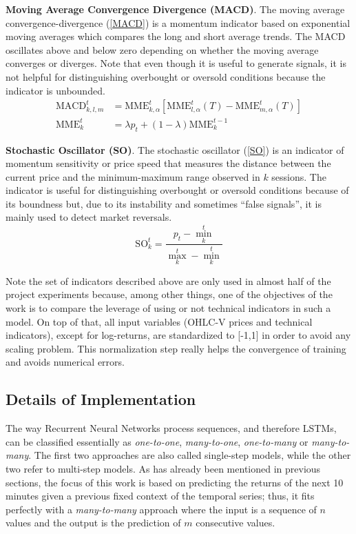 \documentclass[10pt,twocolumn,letterpaper]{article}
\begin{document}
\textbf{Moving Average Convergence Divergence (MACD)}.
The moving average convergence-divergence (\ref{MACD}) is a momentum indicator based on exponential moving averages which compares the long and short average trends. The MACD oscillates above and below zero depending on whether the moving average converges or diverges. Note that even though it is useful to generate signals, it is not helpful for distinguishing overbought or oversold conditions because the indicator is unbounded.
\begin{align} \label{MACD}
	\text{MACD}_{k,l,m}^t &= \text{MME}_{k,\alpha}^t [\text{MME}_{l,\alpha}^t (T) - \text{MME}_{m,\alpha}^t (T)] \nonumber \\
	\text{MME}_k^t &= \lambda p_t + (1 - \lambda)\text{MME}_k^{t-1}
\end{align}

\textbf{Stochastic Oscillator (SO)}.
The stochastic oscillator (\ref{SO}) is an indicator of momentum sensitivity or price speed that measures the distance between the current price and the minimum-maximum range observed in $k$ sessions. The indicator is useful for distinguishing overbought or oversold conditions because of its boundness but, due to its instability and sometimes “false signals”, it is mainly used to detect market reversals.
\begin{equation} \label{SO}
	\text{SO}_k^t = \frac{p_t - \min_k^t}{\max_k^t - \min_k^t}
\end{equation}

Note the set of indicators described above are only used in almost half of the project experiments because, among other things, one of the objectives of the work is to compare the leverage of using or not technical indicators in such a model. On top of that, all input variables (OHLC-V prices and technical indicators), except for log-returns, are standardized to [-1,1] in order to avoid any scaling problem. This normalization step really helps the convergence of training and avoids numerical errors.

\subsection{Details of Implementation}

The way Recurrent Neural Networks process sequences, and therefore LSTMs, can be classified essentially as \textit{one-to-one}, \textit{many-to-one}, \textit{one-to-many} or \textit{many-to-many}. The first two approaches are also called single-step models, while the other two refer to multi-step models. As has already been mentioned in previous sections, the focus of this work is based on predicting the returns of the next 10 minutes given a previous fixed context of the temporal series; thus, it fits perfectly with a \textit{many-to-many} approach where the input is a sequence of $n$ values and the output is the prediction of $m$ consecutive values.
\end{document}
